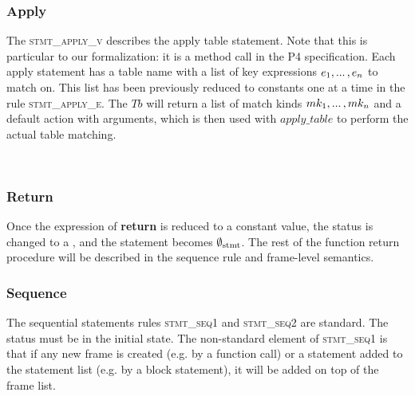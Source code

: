 \documentclass[UTF8]{article}
\begin{document}
\subsubsection*{Apply} 
The \textsc{stmt\_apply\_v} describes the apply table statement. Note that this is particular to our formalization: it is a method call in the P4 specification. Each apply statement has a table name \tn{} with a list of key expressions $e_1 , ... \, , e_n$ to match on. This list has been previously reduced to constants one at a time in the rule \textsc{stmt\_apply\_e}. The $Tb$ will return a list of match kinds $mk_1 , ... \, , mk_n$ and a default action with arguments, which is then used with $\mathit{apply\_table}$ to perform the actual table matching. %


\begin{figure}[ht!]
    \ottusedrule{\ottdrulestmtXXapplyXXtableXXe{}} \\
    \ottusedrule{\ottdrulestmtXXapplyXXtableXXv{}} 
\end{figure}

\subsubsection*{Return}
Once the expression of \textbf{return} is reduced to a constant value, the status is changed to a \returnst{} \cval, and the statement becomes $\emptyset_{ \mathrm{stmt} }{}$. The rest of the function return procedure will be described in the sequence rule and frame-level semantics.

\begin{figure}[ht!]
    \ottusedrule{\ottdrulestmtXXretXXv{}} 
\end{figure}

\subsubsection*{Sequence}
The sequential statements rules \textsc{stmt\_seq1} and \textsc{stmt\_seq2} are standard. The status \status{} must be \running{} in the initial state. The non-standard element of \textsc{stmt\_seq1} is that if any new frame is created (e.g. by a function call) or a statement added to the statement list (e.g. by a block statement), it will be added on top of the frame list. \\
\end{document}
